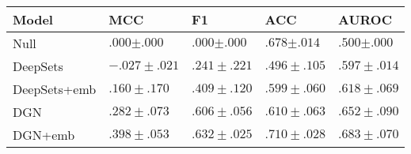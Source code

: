 \begin{tabular}{lllll}
\toprule
Model & \textbf{MCC} & \textbf{F1} & \textbf{ACC} & \textbf{AUROC} \\
\midrule
Null & $.000{\scriptstyle \pm .000}$ & $.000{\scriptstyle \pm .000}$ & $.678{\scriptstyle \pm .014}$ & $.500{\scriptstyle \pm .000}$ \\
DeepSets & $-.027\scriptstyle \pm .021$ & $.241\scriptstyle \pm .221$ & $.496\scriptstyle \pm .105$ & $.597\scriptstyle \pm .014$ \\
DeepSets+emb & $.160\scriptstyle \pm .170$ & $.409\scriptstyle \pm .120$ & $.599\scriptstyle \pm .060$ & $.618\scriptstyle \pm .069$ \\
DGN & $.282\scriptstyle \pm .073$ & $.606\scriptstyle \pm .056$ & $.610\scriptstyle \pm .063$ & $.652\scriptstyle \pm .090$ \\
DGN+emb & $\mathbf{.398\scriptstyle \pm .053}$ & $\mathbf{.632\scriptstyle \pm .025}$ & $\mathbf{.710\scriptstyle \pm .028}$ & $\mathbf{.683\scriptstyle \pm .070}$ \\
\bottomrule
\end{tabular}
